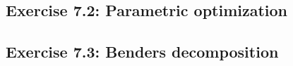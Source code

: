 %

\subsection*{Exercise 7.2: Parametric optimization}


\subsection*{Exercise 7.3: Benders decomposition}



